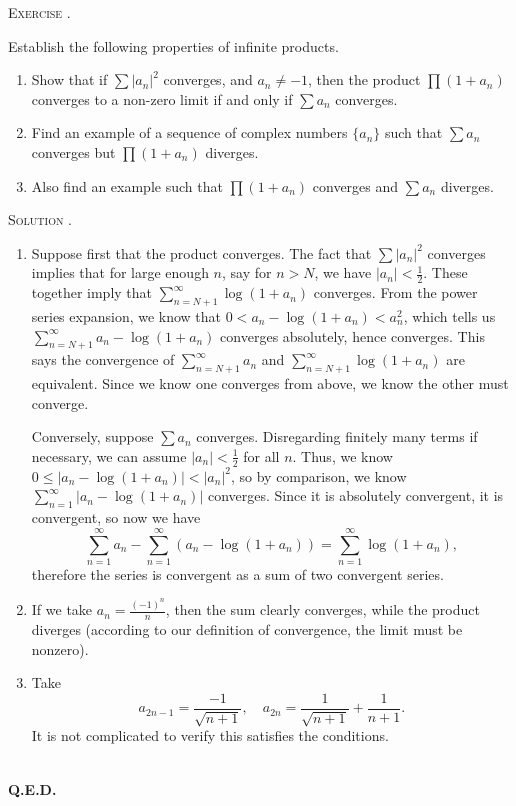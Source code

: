 \documentclass[12pt]{article}
\newcounter{problem}
\renewcommand{\qed}{\hfill\textsc{\textbf{Q.E.D.}}}
\newenvironment{problem}[1][\stepcounter{problem}\theproblem]{\bigskip\noindent\textsc{Exercise #1.}\smallskip\par\begin{itshape}}{\end{itshape}}
\newenvironment{solution}[1][\hspace{-1ex}.]{\medskip\noindent\textsc{Solution #1}\smallskip\par}{\hspace*{\fill}\\ \hspace*{0pt}\qed \clearpage}
\begin{document}
\begin{problem}
    Establish the following properties of infinite products.
    \begin{enumerate}
        \item Show that if $\sum|a_n|^2$ converges, and $a_n\neq-1$, then the product $\prod(1+a_n)$ converges to a non-zero limit if and only if $\sum a_n$ converges.

        \item Find an example of a sequence of complex numbers $\{a_n\}$ such that $\sum a_n$ converges but $\prod (1+a_n)$ diverges.

        \item Also find an example such that $\prod(1+a_n)$ converges and $\sum a_n$ diverges.
    \end{enumerate}
\end{problem}

\begin{solution}\hfill
    \begin{enumerate}
        \item Suppose first that the product converges. The fact that $\sum|a_n|^2$ converges implies that for large enough $n$, say for $n>N$, we have $|a_n|<\frac{1}{2}$. These together imply that $\sum_{n=N+1}^\infty\log(1+a_n)$ converges. From the power series expansion, we know that $0<a_n-\log(1+a_n)<a_n^2$, which tells us $\sum_{n=N+1}^\infty a_n-\log(1+a_n)$ converges absolutely, hence converges. This says the convergence of $\sum_{n=N+1}^\infty a_n$ and $\sum_{n=N+1}^\infty \log(1+a_n)$ are equivalent. Since we know one converges from above, we know the other must converge.
            
            Conversely, suppose $\sum a_n$ converges. Disregarding finitely many terms if necessary, we can assume $|a_n|<\frac{1}{2}$ for all $n$. Thus, we know $0\leq|a_n-\log(1+a_n)|<|a_n|^2$, so by comparison, we know $\sum_{n=1}^\infty |a_n-\log(1+a_n)|$ converges. Since it is absolutely convergent, it is convergent, so now we have \[\sum_{n=1}^\infty a_n-\sum_{n=1}^\infty\left( a_n-\log(1+a_n)\right)=\sum_{n=1}^\infty\log(1+a_n),\]therefore the series is convergent as a sum of two convergent series.
        
        \item If we take $a_n=\frac{(-1)^n}{n}$, then the sum clearly converges, while the product diverges (according to our definition of convergence, the limit must be nonzero).
        
        \item Take
            \[
                a_{2n-1}=\frac{-1}{\sqrt{n+1}},\quad a_{2n}=\frac{1}{\sqrt{n+1}}+\frac{1}{n+1}.
            \]
            It is not complicated to verify this satisfies the conditions.
    \end{enumerate}
\end{solution}
\end{document}
